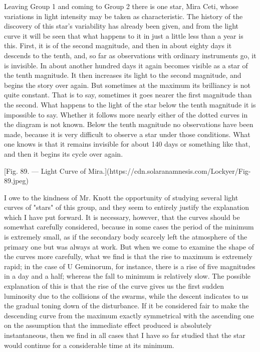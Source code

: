 \documentclass[a4paper, 12pt, oneside, polutonikogreek, english]{article}
\begin{document}
Leaving Group 1 and coming to Group 2 there is one star, Mira Ceti, whose variations in light intensity may be taken as characteristic. The history of the discovery of this star's variability has already been given, and from the light curve it will be seen that what happens to it in just a little less than a year is this. First, it is of the second magnitude, and then in about eighty days it descends to the tenth, and, so far as observations with ordinary instruments go, it is invisible. In about another hundred days it again becomes visible as a star of the tenth magnitude. It then increases its light to the second magnitude, and begins the story over again. But sometimes at the maximum its brilliancy is not quite constant. That is to say, sometimes it goes nearer the first magnitude than the second. What happens to the light of the star below the tenth magnitude it is impossible to say. Whether it follows more nearly either of the dotted curves in the diagram is not known. Below the tenth magnitude no observations have been made, because it is very difficult to observe a star under those conditions. What one knows is that it remains invisible for about 140 days or something like that, and then it begins its cycle over again.

[Fig. 89. --- Light Curve of Mira.](https://cdn.solaranamnesis.com/Lockyer/Fig-89.jpeg)

I owe to the kindness of Mr. Knott the opportunity of studying several light curves of "stars" of this group, and they seem to entirely justify the explanation which I have put forward. It is necessary, however, that the curves should be somewhat carefully considered, because in some cases the period of the minimum is extremely small, as if the secondary body scarcely left the atmosphere of the primary one but was always at work. But when we come to examine the shape of the curves more carefully, what we find is that the rise to maximum is extremely rapid; in the case of U Geminorum, for instance, there is a rise of five magnitudes in a day and a half; whereas the fall to minimum is relatively slow. The possible explanation of this is that the rise of the curve gives us the first sudden luminosity due to the collisions of the swarms, while the descent indicates to us the gradual toning down of the disturbance. If it be considered fair to make the descending curve from the maximum exactly symmetrical with the ascending one on the assumption that the immediate effect produced is absolutely instantaneous, then we find in all cases that I have so far studied that the star would continue for a considerable time at its minimum.
\end{document}
